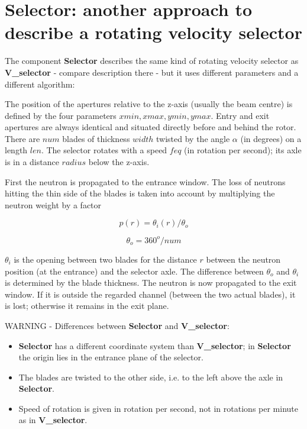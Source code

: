\section{Selector: another approach to describe a rotating velocity selector}
\label{selector}


The component \textbf{Selector} describes the same kind of rotating velocity selector as \textbf{V\_selector} - compare
description there - but it uses different parameters and a different algorithm:

The position of the apertures relative to the z-axis (usually the beam centre) is defined by the four parameters
$xmin, xmax, ymin, ymax$. Entry and exit apertures are always identical and situated directly before and behind
the rotor.
There are $num$ blades of thickness $width$ twisted by the angle $\alpha$ (in degrees) on a length $len$.
The selector rotates with a speed $feq$ (in rotation per second); its axle is in a distance $radius$ below the z-axis.

First the neutron is propagated to the entrance window. The loss of neutrons hitting the thin side
of the blades is taken into account by multiplying the neutron weight by a factor

\begin{equation}
   p(r) = \theta_i(r) / \theta_o
\end{equation}

\begin{equation}
   \theta_o = 360^o / num
\end{equation}

$\theta_i$ is the opening between two blades for the distance $r$ between the neutron position (at the entrance)
and the selector axle. The difference between $\theta_o$ and $\theta_i$ is determined by the blade thickness.
The neutron is now propagated to the exit window. If it is outside the regarded channel (between the two actual
blades), it is lost; otherwise it remains in the exit plane.

WARNING - Differences between \textbf{Selector} and \textbf{V\_selector}:
\begin{itemize}
\item \textbf{Selector} has a different coordinate system than \textbf{V\_selector};
in \textbf{Selector} the origin lies in the entrance plane of the selector.
\item The blades are twisted to the other side, i.e. to the left above the axle in \textbf{Selector}.
\item Speed of rotation is given in rotation per second, not in rotations per minute as in \textbf{V\_selector}.
\end{itemize}



